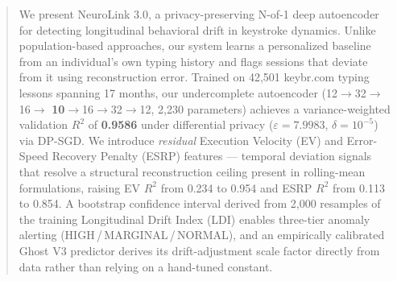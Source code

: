 \begin{abstract}
We present NeuroLink 3.0, a privacy-preserving N-of-1 deep autoencoder for
detecting longitudinal behavioral drift in keystroke dynamics.
Unlike population-based approaches, our system learns a personalized baseline
from an individual's own typing history and flags sessions that deviate from
it using reconstruction error.
Trained on 42,501 keybr.com typing lessons spanning 17 months,
our undercomplete autoencoder (12\(\rightarrow\)32\(\rightarrow\)16\(\rightarrow\)
\textbf{10}\(\rightarrow\)16\(\rightarrow\)32\(\rightarrow\)12, 2,230 parameters)
achieves a variance-weighted validation \(R^2\) of \textbf{0.9586} under
differential privacy (\(\varepsilon{=}7.9983\), \(\delta{=}10^{-5}\)) via DP-SGD.
We introduce \emph{residual} Execution Velocity (EV) and Error-Speed Recovery
Penalty (ESRP) features — temporal deviation signals that resolve a structural
reconstruction ceiling present in rolling-mean formulations, raising EV \(R^2\)
from 0.234 to 0.954 and ESRP \(R^2\) from 0.113 to 0.854.
A bootstrap confidence interval derived from 2,000 resamples of the training
Longitudinal Drift Index (LDI) enables three-tier anomaly alerting
(HIGH\,/\,MARGINAL\,/\,NORMAL), and an empirically calibrated Ghost V3
predictor derives its drift-adjustment scale factor directly from data
rather than relying on a hand-tuned constant.
\end{abstract}
